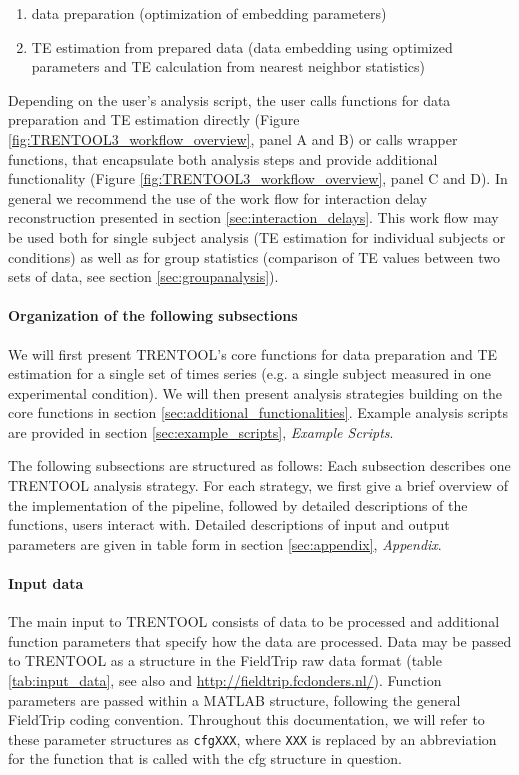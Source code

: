 \documentclass[a4paper,10pt]{article}
\begin{document}
\begin{enumerate}
 \item data preparation (optimization of embedding parameters)
 \item TE estimation from prepared data (data embedding using optimized parameters and TE calculation from nearest neighbor statistics)
\end{enumerate}

Depending on the user's analysis script, the user calls functions for data preparation and TE estimation directly (Figure \ref{fig:TRENTOOL3_workflow_overview}, panel A and B) or calls wrapper functions, that encapsulate both analysis steps and provide additional functionality (Figure \ref{fig:TRENTOOL3_workflow_overview}, panel C and D). In general we recommend the use of the work flow for interaction delay reconstruction presented in section \ref{sec:interaction_delays}. This work flow may be used both for single subject analysis (TE estimation for individual subjects or conditions) as well as for group statistics (comparison of TE values between two sets of data, see section \ref{sec:groupanalysis}).

\paragraph*{Organization of the following subsections} We will first present TRENTOOL's core functions for data preparation and TE estimation for a single set of times series (e.g. a single subject measured in one experimental condition). We will then present analysis strategies building on the core functions in section \ref{sec:additional_functionalities}. Example analysis scripts are provided in section \ref{sec:example_scripts}, \textit{Example Scripts}.

The following subsections are structured as follows: Each subsection describes one TRENTOOL analysis strategy. For each strategy, we first give a brief overview of the implementation of the pipeline, followed by detailed descriptions of the functions, users interact with. Detailed descriptions of input and output parameters are given in table form in section \ref{sec:appendix}, \textit{Appendix}.

\paragraph*{Input data} The main input to TRENTOOL consists of data to be processed and additional function parameters that specify how the data are processed. Data may be passed to TRENTOOL as a structure in the FieldTrip raw data format (table \ref{tab:input_data}, see also \cite{oostenveld2011} and \url{http://fieldtrip.fcdonders.nl/}). Function parameters are passed within a MATLAB structure, following the general FieldTrip coding convention. Throughout this documentation, we will refer to these parameter structures as \verb&cfgXXX&, where \verb&XXX& is replaced by an abbreviation for the function that is called with the cfg structure in question.
\end{document}
